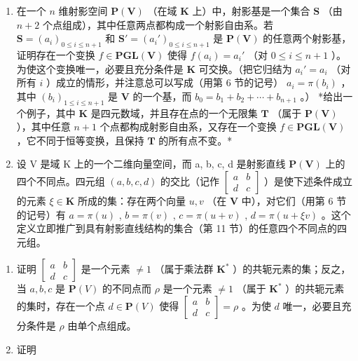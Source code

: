\begin{enumerate}
\def\labelenumi{\arabic{enumi}.}
\setcounter{enumi}{9}
\item
  在一个 \(n\) 维射影空间 \(\mathbf{P}(\mathbf{V})\) （在域 \(\mathbf{K}\) 上）中，射影基是一个集合 \(\mathbf{S}\) （由 \(n + 2\) 个点组成），其中任意两点都构成一个射影自由系。若 \(\mathbf{S} = (a_i)_{0 \leqslant i \leqslant n + 1}\) 和 \(\mathbf{S}' = (a_i')_{0 \leqslant i \leqslant n + 1}\) 是 \(\mathbf{P}(\mathbf{V})\) 的任意两个射影基，证明存在一个变换 \(f \in \mathbf{PGL}(\mathbf{V})\) 使得 \(f(a_i) = a_i'\) （对 \(0 \leqslant i \leqslant n + 1\) ）。为使这个变换唯一，必要且充分条件是 \(\mathbf{K}\) 可交换。（把它归结为 \(a_i' = a_i\) （对所有 \(i\) ）成立的情形，并注意总可以写成（用第 6 节的记号） \(a_i = \pi(b_i)\) ，其中 \((b_i)_{1 \leqslant i \leqslant n + 1}\) 是 \(\mathbf{V}\) 的一个基，而 \(b_0 = b_1 + b_2 + \cdots + b_{n+1}\) 。） *给出一个例子，其中 \(\mathbf{K}\) 是四元数域，并且存在点的一个无限集 \(\mathbf{T}\) （属于 \(\mathbf{P}(\mathbf{V})\) ），其中任意 \(n + 1\) 个点都构成射影自由系，又存在一个变换 \(f \in \mathbf{PGL}(\mathbf{V})\) ，它不同于恒等变换，且保持 \(\mathbf{T}\) 的所有点不变。*
\item
  设 V 是域 K 上的一个二维向量空间，而 a, b, c, d 是射影直线 \(\mathbf{P}(\mathbf{V})\) 上的四个不同点。四元组 \((a, b, c, d)\) 的交比（记作 \(\begin{bmatrix} a & b \\ d & c \end{bmatrix}\) ）是使下述条件成立的元素 \(\xi \in \mathbf{K}\) 所成的集：存在两个向量 \(u, v\) （在 \(\mathbf{V}\) 中），对它们（用第 6 节的记号）有 \(a = \pi(u)\) , \(b = \pi(v)\) , \(c = \pi(u + v)\) , \(d = \pi(u + \xi v)\) 。这个定义立即推广到具有射影直线结构的集合（第 11 节）的任意四个不同点的四元组。
\end{enumerate}

\begin{enumerate}
\def\labelenumi{(\alph{enumi})}
\item
  证明 \(\begin{bmatrix} a & b \\ d & c \end{bmatrix}\) 是一个元素 \(\neq 1\) （属于乘法群 \(\mathbf{K}^*\) ）的共轭元素的集；反之，当 \(a, b, c\) 是 \(\mathbf{P}(V)\) 的不同点而 \(\rho\) 是一个元素 \(\neq 1\) （属于 \(\mathbf{K}^*\) ）的共轭元素的集时，存在一个点 \(d \in \mathbf{P}(V)\) 使得 \(\begin{bmatrix} a & b \\ d & c \end{bmatrix} = \rho\) 。为使 \(d\) 唯一，必要且充分条件是 \(\rho\) 由单个点组成。
\item
  证明
\end{enumerate}

